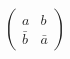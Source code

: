 \begin{equation}
  \label{eq:su11}
  \begin{pmatrix}
    a & b \\ \bar b & \bar a
  \end{pmatrix}
\end{equation}

